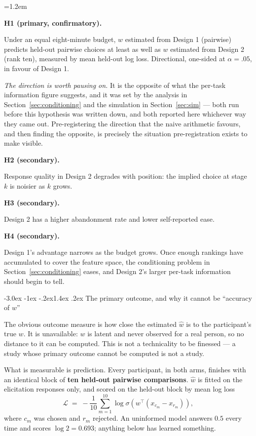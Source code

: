 \documentclass[11pt,a4paper]{article}
\makeatletter
\renewcommand\subsection{\@startsection{subsection}{2}{\z@}%
  {-3.0ex \@plus -1ex \@minus -.2ex}{1.4ex \@plus .2ex}%
  {\normalfont\large\sffamily\bfseries\color{accent}}}
\newcommand{\term}[1]{\par\medskip\noindent\textbf{#1}\par\nopagebreak\vspace{0.15em}}
\newenvironment{terms}{\par\begingroup\leftskip=1.2em}{\par\endgroup\medskip}
\makeatother
\begin{document}
\begin{terms}
\term{H1 (primary, confirmatory).} Under an equal eight-minute budget, $w$
  estimated from Design 1 (pairwise) predicts held-out pairwise choices at least
  as well as $w$ estimated from Design 2 (rank ten), measured by mean held-out
  log loss. Directional, one-sided at $\alpha = .05$, in favour of Design 1.

  \emph{The direction is worth pausing on.} It is the opposite of what the
  per-task information figure suggests, and it was set by the analysis in
  Section~\ref{sec:conditioning} and the simulation in Section~\ref{sec:sim} ---
  both run before this hypothesis was written down, and both reported here
  whichever way they came out. Pre-registering the direction that the naive
  arithmetic favours, and then finding the opposite, is precisely the situation
  pre-registration exists to make visible.
\term{H2 (secondary).} Response quality in Design 2 degrades with position: the
  implied choice at stage $k$ is noisier as $k$ grows.
\term{H3 (secondary).} Design 2 has a higher abandonment rate and lower
  self-reported ease.
\term{H4 (secondary).} Design 1's advantage narrows as the budget grows. Once
  enough rankings have accumulated to cover the feature space, the conditioning
  problem in Section~\ref{sec:conditioning} eases, and Design 2's larger per-task
  information should begin to tell.
\end{terms}

\subsection{The primary outcome, and why it cannot be ``accuracy of $w$''}
\label{sec:outcome}

The obvious outcome measure is how close the estimated $\hat{w}$ is to the
participant's true $w$. It is unavailable: $w$ is latent and never observed for a
real person, so no distance to it can be computed. This is not a technicality to
be finessed --- a study whose primary outcome cannot be computed is not a study.

What is measurable is prediction. Every participant, in both arms, finishes with
an identical block of \textbf{ten held-out pairwise comparisons}. $\hat{w}$ is
fitted on the elicitation responses only, and scored on the held-out block by
mean log loss
\[
  \mathcal{L} \;=\; -\frac{1}{10}\sum_{m=1}^{10} \log
    \sigma\!\left(w^{\!\top}(x_{c_m} - x_{r_m})\right),
\]
where $c_m$ was chosen and $r_m$ rejected. An uninformed model answers $0.5$
every time and scores $\log 2 = 0.693$; anything below has learned something.
\end{document}
